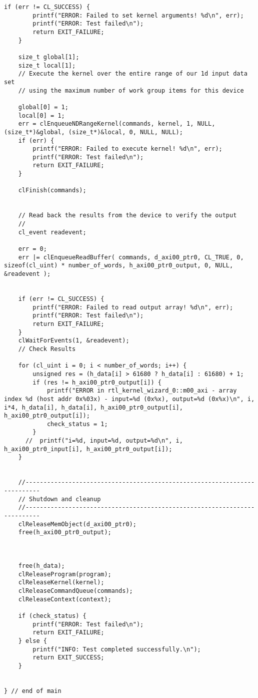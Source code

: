 \begin{lstlisting}[label=code:hostexample3, caption=Содержимое файла host\_example.cpp, breakatwhitespace=false]
    if (err != CL_SUCCESS) {
        printf("ERROR: Failed to set kernel arguments! %d\n", err);
        printf("ERROR: Test failed\n");
        return EXIT_FAILURE;
    }

    size_t global[1];
    size_t local[1];
    // Execute the kernel over the entire range of our 1d input data set
    // using the maximum number of work group items for this device

    global[0] = 1;
    local[0] = 1;
    err = clEnqueueNDRangeKernel(commands, kernel, 1, NULL, (size_t*)&global, (size_t*)&local, 0, NULL, NULL);
    if (err) {
        printf("ERROR: Failed to execute kernel! %d\n", err);
        printf("ERROR: Test failed\n");
        return EXIT_FAILURE;
    }

    clFinish(commands);


    // Read back the results from the device to verify the output
    //
    cl_event readevent;

    err = 0;
    err |= clEnqueueReadBuffer( commands, d_axi00_ptr0, CL_TRUE, 0, sizeof(cl_uint) * number_of_words, h_axi00_ptr0_output, 0, NULL, &readevent );


    if (err != CL_SUCCESS) {
        printf("ERROR: Failed to read output array! %d\n", err);
        printf("ERROR: Test failed\n");
        return EXIT_FAILURE;
    }
    clWaitForEvents(1, &readevent);
    // Check Results

    for (cl_uint i = 0; i < number_of_words; i++) {
        unsigned res = (h_data[i] > 61680 ? h_data[i] : 61680) + 1;
        if (res != h_axi00_ptr0_output[i]) {
            printf("ERROR in rtl_kernel_wizard_0::m00_axi - array index %d (host addr 0x%03x) - input=%d (0x%x), output=%d (0x%x)\n", i, i*4, h_data[i], h_data[i], h_axi00_ptr0_output[i], h_axi00_ptr0_output[i]);
            check_status = 1;
        }
      //  printf("i=%d, input=%d, output=%d\n", i,  h_axi00_ptr0_input[i], h_axi00_ptr0_output[i]);
    }


    //--------------------------------------------------------------------------
    // Shutdown and cleanup
    //-------------------------------------------------------------------------- 
    clReleaseMemObject(d_axi00_ptr0);
    free(h_axi00_ptr0_output);



    free(h_data);
    clReleaseProgram(program);
    clReleaseKernel(kernel);
    clReleaseCommandQueue(commands);
    clReleaseContext(context);

    if (check_status) {
        printf("ERROR: Test failed\n");
        return EXIT_FAILURE;
    } else {
        printf("INFO: Test completed successfully.\n");
        return EXIT_SUCCESS;
    }


} // end of main
\end{lstlisting}

